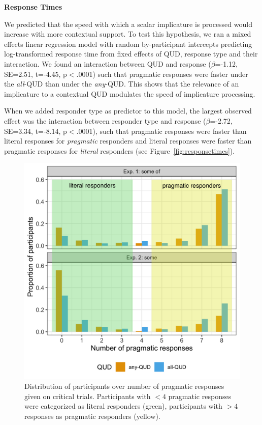 \documentclass[10pt,letterpaper]{article}
\begin{document}
\noindent \textbf{Response Times} 

We predicted that the speed with which a scalar implicature is processed would increase with more contextual support. To test this hypothesis, we ran a mixed effects linear regression model with random by-participant intercepts predicting log-transformed response time from fixed effects of QUD, response type and their interaction. We found an interaction between QUD and response ($\beta$=-1.12, SE=2.51, t=-4.45, p$<$.0001) such that pragmatic responses were faster under the \textit{all}-QUD than under the \textit{any}-QUD. This shows that the relevance of an implicature to a contextual QUD modulates the speed of implicature processing. 

When we added responder type as predictor to this model, the largest observed effect was the interaction between responder type and response ($\beta$=-2.72, SE=3.34, t=-8.14, p$<$.0001), such that pragmatic responses were faster than literal responses for \emph{pragmatic}  responders and literal responses were faster than pragmatic responses for \emph{literal} responders (see Figure~\ref{fig:responsetimes}).

\begin{figure}
  \includegraphics[width=\linewidth]{plots/proportion.png}
  \caption{Distribution of participants over number of pragmatic responses given on critical trials. Participants with $< 4$ pragmatic responses were categorized as literal responders (green), participants with $> 4$ responses as pragmatic responders (yellow). }
  \label{fig:proportion}
\end{figure}
\end{document}
